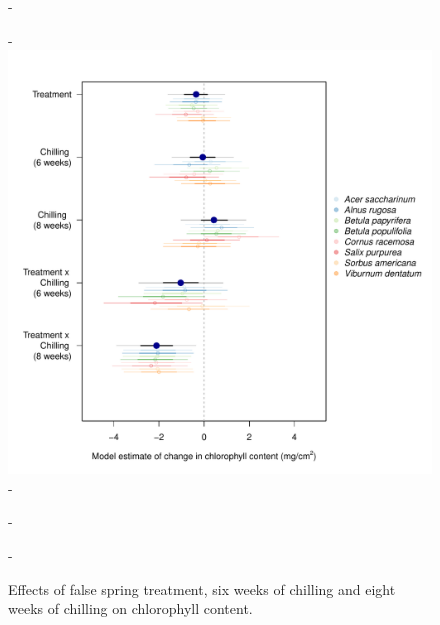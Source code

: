 \documentclass{article}\usepackage[]{graphicx}\usepackage[]{color}
\begin{document}
{\begin{figure} [H]
  -\begin{center}
  -\includegraphics[width=14cm]{..//analyses/figures/chloro50and90_brms.pdf} 
  -\caption{Effects of false spring treatment, six weeks of chilling and eight weeks of chilling on chlorophyll content. }\label{fig:muchl}
  -\end{center}
  -\end{figure}}
\end{document}
